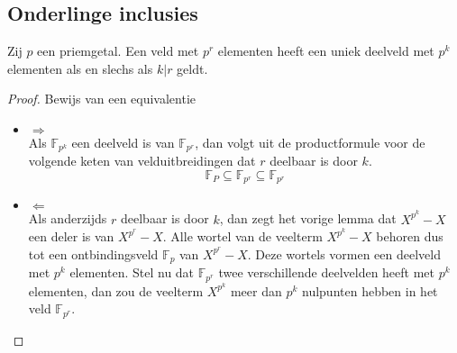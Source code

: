 \documentclass[main.tex]{subfiles}
\begin{document}
\subsection{Onderlinge inclusies}
\label{sec:onderlinge-inclusies}

\begin{st}
  Zij $p$ een priemgetal.
  Een veld met $p^{r}$ elementen heeft een uniek deelveld met $p^{k}$ elementen als en slechs als $k|r$ geldt.

  \begin{proof}
    Bewijs van een equivalentie
    \begin{itemize}
    \item $\Rightarrow$\\
      Als $\mathbb{F}_{p^{k}}$ een deelveld is van $\mathbb{F}_{p^{r}}$, dan volgt uit de productformule voor de volgende keten van velduitbreidingen dat $r$ deelbaar is door $k$.
      \[ \mathbb{F}_{P} \subseteq \mathbb{F}_{p^{r}} \subseteq \mathbb{F}_{p^{r}} \]
    \item $\Leftarrow$\\
      Als anderzijds $r$ deelbaar is door $k$, dan zegt het vorige lemma dat $X^{p^{k}}-X$ een deler is van $X^{p^{r}}-X$.
      Alle wortel van de veelterm $X^{p^{k}}-X$ behoren dus tot een ontbindingsveld $\mathbb{F}_{p}$ van $X^{p^{r}}-X$.
      Deze wortels vormen een deelveld met $p^{k}$ elementen.
      Stel nu dat $\mathbb{F}_{p^{r}}$ twee verschillende deelvelden heeft met $p^{k}$ elementen, dan zou de veelterm $X^{p^{k}}$ meer dan $p^{k}$ nulpunten hebben in het veld $\mathbb{F}_{p^{r}}$.
    \end{itemize}
  \end{proof}
\end{st}
\end{document}
